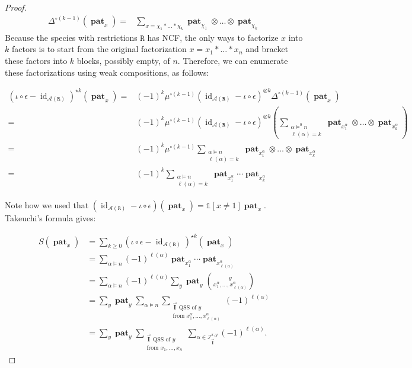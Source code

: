 \documentclass[12pt, reqno]{amsart}
\theoremstyle{definition}
\newcommand{\III}{\vec{\mathbf{I}}}
\DeclareMathOperator{\id}{id}
\DeclareMathOperator{\pat}{\mathbf{pat}}
\begin{document}
\begin{proof}
\begin{align*}
\Delta^{\circ (k-1)} (\pat_x)
    =& \sum_{x = \chi_1 \ast \dots \ast \chi_k} \pat_{\chi_1}\otimes \dots \otimes \pat_{\chi_k}
\end{align*}
Because the species with restrictions $\mathtt{R}$ has NCF, the only ways to factorize $x$ into $k$ factors is to start from the original factorization $x = x_1 \ast \dots \ast x_n$ and bracket these factors into $k$ blocks, possibly empty, of $n$.
Therefore, we can enumerate these factorizations using weak compositions, as follows:

\begin{align*}
(\iota \circ \epsilon -  \id_{\mathcal A (\mathtt{R})})^{\star k} (\pat_x)
    =& (-1)^k  \mu^{\circ(k-1)}( \id_{\mathcal A (\mathtt{R})} - \iota \circ \epsilon)^{\otimes k} \Delta^{\circ(k-1)} (\pat_x)\\
    =& (-1)^k  \mu^{\circ(k-1)}( \id_{\mathcal A (\mathtt{R})} - \iota \circ \epsilon)^{\otimes k}\left(\sum_{\substack{\alpha\models^0 n \\ \ell(\alpha) = k}} \pat_{x^{\alpha}_1} \otimes \dots \otimes \pat_{x^{\alpha}_k} \right) \\
    =&  (-1)^k  \mu^{\circ(k-1)} \sum_{\substack{\alpha\models n \\ \ell(\alpha) = k}}  \pat_{x^{\alpha}_1} \otimes \dots \otimes \pat_{x^{\alpha}_k}\\
    =&  (-1)^k \sum_{\substack{\alpha\models n \\ \ell(\alpha) = k}}  \pat_{x^{\alpha}_1}  \cdots \pat_{x^{\alpha}_k}
\end{align*}

Note how we used that $(\id_{\mathcal A (\mathtt{R})} - \iota \circ \epsilon ) (\pat_x) = \mathbb{1}[x \neq 1]\pat_x$.
Takeuchi's formula gives:

\begin{align*}
S(\pat_x)&= \sum_{k\geq 0 } (\iota \circ \epsilon -  \id_{\mathcal A (\mathtt{R})})^{\star k} (\pat_x) \\
         &= \sum_{\alpha \models n} (-1)^{\ell(\alpha)} \pat_{x^{\alpha}_1} \cdots \pat_{x^{\alpha}_{\ell(\alpha)}}\\
         &= \sum_{\alpha \models n } (-1)^{\ell(\alpha)} \sum_y \pat_y \binom{y}{x^{\alpha}_1,  \dots , x^{\alpha}_{\ell(\alpha)}}\\
         &= \sum_y \pat_y \sum_{\alpha \models n} \sum_{  \substack{\III \text{ QSS of $y$}\\ \text{from }x^{\alpha}_1,  \dots , x^{\alpha}_{\ell(\alpha)} }} (-1)^{\ell(\alpha)}\\
         &= \sum_y \pat_y \sum_{  \substack{\III \text{ QSS of $y$}\\ \text{from }x_1 , \dots ,  x_n }} \sum_{\alpha \in \mathcal I^{x, y}_{\III}} (-1)^{\ell(\alpha)}.
\end{align*}


\end{proof}
\end{document}
